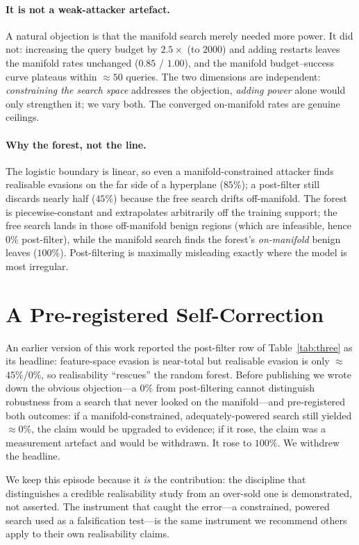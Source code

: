 \documentclass[10pt,twocolumn]{article}
\begin{document}
\paragraph{It is not a weak-attacker artefact.}
A natural objection is that the manifold search merely needed more power. It did
not: increasing the query budget by $2.5\times$ (to $2000$) and adding restarts
leaves the manifold rates unchanged ($0.85$ / $1.00$), and the manifold
budget--success curve plateaus within $\approx 50$ queries. The two dimensions
are independent: \emph{constraining the search space} addresses the objection,
\emph{adding power} alone would only strengthen it; we vary both. The converged
on-manifold rates are genuine ceilings.

\paragraph{Why the forest, not the line.}
The logistic boundary is linear, so even a manifold-constrained attacker finds
realisable evasions on the far side of a hyperplane ($85\%$); a post-filter still
discards nearly half ($45\%$) because the free search drifts off-manifold. The
forest is piecewise-constant and extrapolates arbitrarily off the training
support; the free search lands in those off-manifold benign regions (which are
infeasible, hence $0\%$ post-filter), while the manifold search finds the forest's
\emph{on-manifold} benign leaves ($100\%$). Post-filtering is maximally
misleading exactly where the model is most irregular.

\section{A Pre-registered Self-Correction}
\label{sec:honesty}

An earlier version of this work reported the post-filter row of
Table~\ref{tab:three} as its headline: feature-space evasion is near-total but
realisable evasion is only $\approx$$45\%$/$0\%$, so realisability ``rescues'' the
random forest. Before publishing we wrote down the obvious objection---a $0\%$ from
post-filtering cannot distinguish robustness from a search that never looked on
the manifold---and pre-registered both outcomes: if a manifold-constrained,
adequately-powered search still yielded $\approx 0\%$, the claim would be upgraded
to evidence; if it rose, the claim was a measurement artefact and would be
withdrawn. It rose to $100\%$. We withdrew the headline.

We keep this episode because it \emph{is} the contribution: the discipline that
distinguishes a credible realisability study from an over-sold one is
demonstrated, not asserted. The instrument that caught the error---a constrained,
powered search used as a falsification test---is the same instrument we recommend
others apply to their own realisability claims.
\end{document}
